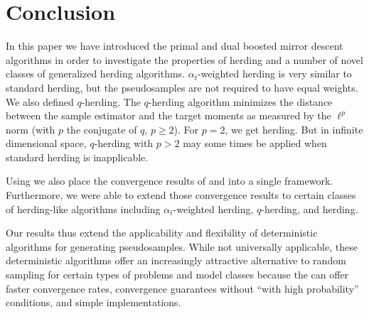 \documentclass[paper.tex]{subfiles}
\begin{document}
\section{Conclusion} 
\label{sec:conclusion}

In this paper we have introduced the primal and dual boosted mirror descent algorithms in order to investigate the properties of herding and a number of novel classes of generalized herding algorithms. $\alpha_{t}$-weighted herding is very similar to standard herding, but the pseudosamples are not required to have equal weights. We also defined $q$-herding. The $q$-herding algorithm minimizes the distance between the sample estimator and the target moments as measured by the $\ell^{p}$ norm (with $p$ the conjugate of $q$, $p \ge 2$). For $p = 2$, we get herding. But in infinite dimensional space, $q$-herding with $p > 2$ may some times be applied when standard herding is inapplicable. 

Using \bmd we also place the convergence results of \citet{Chen:2010} and \citet{Bach:2010} into a single framework. Furthermore, we were able to extend those convergence results to certain classes of herding-like algorithms including $\alpha_{t}$-weighted herding, $q$-herding, and  herding.

Our results thus extend the applicability and flexibility of deterministic algorithms for generating pseudosamples. While not universally applicable, these deterministic algorithms offer an increasingly attractive alternative to random sampling for certain types of problems and model classes because the can offer faster convergence rates, convergence guarantees without ``with high probability'' conditions, and simple implementations. 
\end{document}
